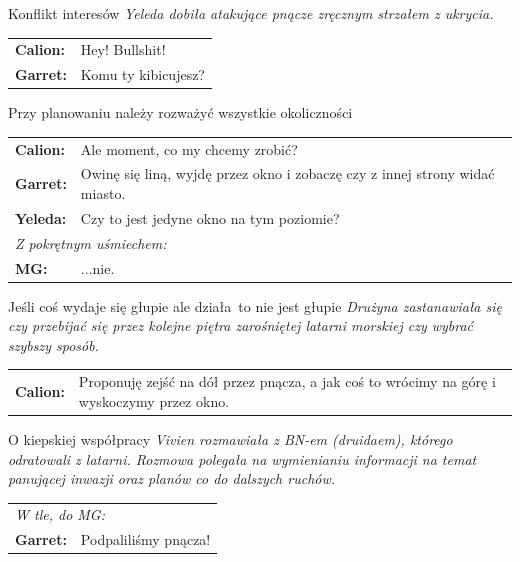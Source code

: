 \documentclass[10pt,twoside,twocolumn]{book}
\begin{document}
\begin{rpg-quotebox}{Konflikt interesów}
   \textit{Yeleda dobiła atakujące pnącze zręcznym strzałem z ukrycia.}\\

   \begin{tabularx}{\columnwidth}{lX}
      \textbf{Calion:} & Hey! Bullshit!\\
      \textbf{Garret:} & Komu ty kibicujesz?\\
   \end{tabularx}
\end{rpg-quotebox}

\begin{rpg-quotebox}{Przy planowaniu należy rozważyć wszystkie okoliczności}
   \begin{tabularx}{\columnwidth}{lX}
      \textbf{Calion:} & Ale moment, co my chcemy zrobić?\\
      \textbf{Garret:} & Owinę się liną, wyjdę przez okno i zobaczę czy z innej strony widać miasto.\\
      \textbf{Yeleda:} & Czy to jest jedyne okno na tym poziomie?\\
      \multicolumn{2}{l}{\textit{Z pokrętnym uśmiechem:}}\\
      \textbf{MG:} & ...nie.\\
   \end{tabularx}
\end{rpg-quotebox}

\begin{rpg-quotebox}{Jeśli coś wydaje się głupie ale działa\, to nie jest głupie}
   \textit{Drużyna zastanawiała się czy przebijać się przez kolejne piętra zarośniętej latarni morskiej czy wybrać szybszy sposób.}\\

   \begin{tabularx}{\columnwidth}{lX}
      \textbf{Calion:} & Proponuję zejść na dół przez pnącza, a jak coś to wrócimy na górę i wyskoczymy przez okno.\\
   \end{tabularx}
\end{rpg-quotebox}

\begin{rpg-quotebox}{O kiepskiej współpracy}
   \textit{Vivien rozmawiała z BN-em (druidaem), którego odratowali z latarni. Rozmowa polegała na wymienianiu informacji na temat panującej inwazji oraz planów co do dalszych ruchów.}\\
   
   \begin{tabularx}{\columnwidth}{lX}
      \multicolumn{2}{l}{\textit{W tle, do MG:}}\\
      \textbf{Garret:} & Podpaliliśmy pnącza!\\
   \end{tabularx}
\end{rpg-quotebox}
\end{document}
